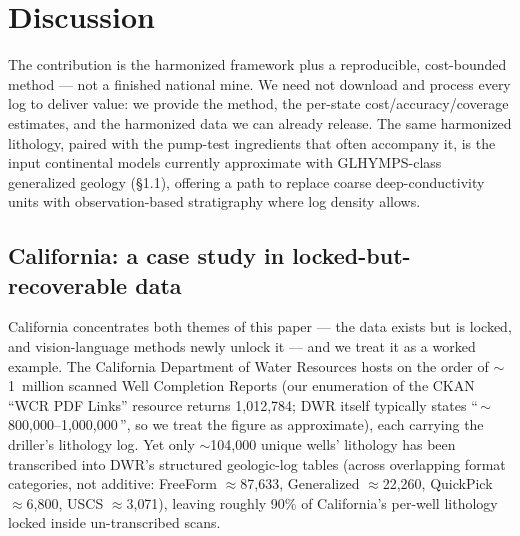 \documentclass[12pt]{article}
\begin{document}
\section{Discussion}
The contribution is the harmonized framework plus a reproducible, cost-bounded method --- not a finished
national mine. We need not download and process every log to deliver value: we provide the method, the
per-state cost/accuracy/coverage estimates, and the harmonized data we can already release. The same
harmonized lithology, paired with the pump-test ingredients that often accompany it, is the input
continental models currently approximate with GLHYMPS-class generalized geology (§1.1), offering a path to
replace coarse deep-conductivity units with observation-based stratigraphy where log density allows.

\subsection{California: a case study in locked-but-recoverable data}
\label{sec:california}
California concentrates both themes of this paper --- the data exists but is locked, and vision-language
methods newly unlock it --- and we treat it as a worked example. The California Department of Water Resources
hosts on the order of $\sim$1~million scanned Well Completion Reports (our enumeration of the CKAN
``WCR PDF Links'' resource returns 1{,}012{,}784; DWR itself typically states ``\,$\sim$800{,}000--1{,}000{,}000\,'',
so we treat the figure as approximate), each carrying the driller's lithology log. Yet only
$\sim$104{,}000 unique wells' lithology has been transcribed into DWR's structured geologic-log tables
(across overlapping format categories, not additive: FreeForm $\approx$87{,}633, Generalized
$\approx$22{,}260, QuickPick $\approx$6{,}800, USCS $\approx$3{,}071), leaving roughly 90\% of California's
per-well lithology locked inside un-transcribed scans.
\end{document}
